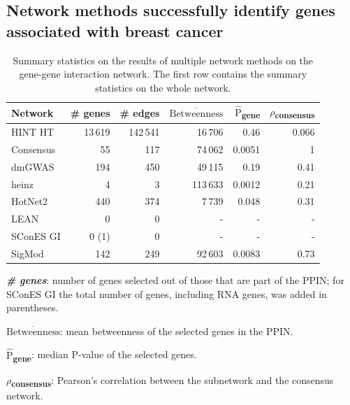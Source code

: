 \documentclass[twocolumn, 10pt]{article}
\newcommand{\mean}[1]{$\overline{\mbox{#1}}$}
\newcommand{\median}[1]{$\hat{\mbox{#1}}$}
\begin{document}
\subsection{Network methods successfully identify genes associated with breast cancer}
\label{results:separate_networks}
\begin{table}[htbp]
  \centering
  \begin{threeparttable}
\caption{\label{tab:gene_solutions}
Summary statistics on the results of multiple network methods on the gene-gene interaction network. The first row contains the summary statistics on the whole network.}
\centering
\begin{tabular}{lrrrrr}
Network & \# genes & \# edges & \mean{Betweenness} & \median{P}\textsubscript{gene} & \(\rho\)\textsubscript{consensus}\\
\hline
HINT HT & 13\,619 & 142\,541 & 16\,706 & 0.46 & 0.066\\
\hline
Consensus & 55 & 117 & 74\,062 & 0.0051 & 1\\
dmGWAS & 194 & 450 & 49\,115 & 0.19 & 0.41\\
heinz & 4 & 3 & 113\,633 & 0.0012 & 0.21\\
HotNet2 & 440 & 374 & 7\,739 & 0.048 & 0.31\\
LEAN & 0 & 0 & - & - & -\\
SConES GI & 0 (1) & 0 & - & - & -\\
SigMod & 142 & 249 & 92\,603 & 0.0083 & 0.73\\
\end{tabular}
\begin{tablenotes}
  \item \textbf{\emph{\# genes}}: number of genes selected out of those that are part of the PPIN; for SConES GI the total number of genes, including RNA genes, was added in parentheses.
  \item \textbf{\mean{Betweenness}}: mean betweenness of the selected genes in the PPIN.
  \item \textbf{\median{P}\textsubscript{gene}}: median P-value of the selected genes.
  \item \textbf{\(\rho\)\textsubscript{consensus}}: Pearson's correlation between the subnetwork and the consensus network.
\end{tablenotes}
\end{threeparttable}
\end{table}
\end{document}
